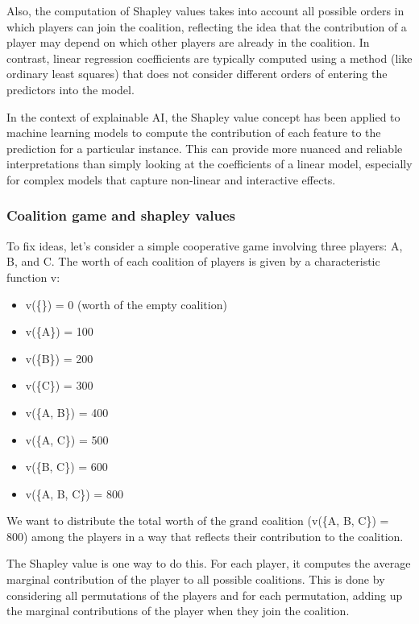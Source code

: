 \documentclass[
  letterpaper,
  DIV=11,
  numbers=noendperiod]{scrartcl}
\providecommand{\tightlist}{%
  \setlength{\itemsep}{0pt}\setlength{\parskip}{0pt}}\usepackage{longtable,booktabs,array}
\begin{document}
Also, the computation of Shapley values takes into account all possible
orders in which players can join the coalition, reflecting the idea that
the contribution of a player may depend on which other players are
already in the coalition. In contrast, linear regression coefficients
are typically computed using a method (like ordinary least squares) that
does not consider different orders of entering the predictors into the
model.

In the context of explainable AI, the Shapley value concept has been
applied to machine learning models to compute the contribution of each
feature to the prediction for a particular instance. This can provide
more nuanced and reliable interpretations than simply looking at the
coefficients of a linear model, especially for complex models that
capture non-linear and interactive effects.

\hypertarget{coalition-game-and-shapley-values}{%
\subsubsection{Coalition game and shapley
values}\label{coalition-game-and-shapley-values}}

To fix ideas, let's consider a simple cooperative game involving three
players: A, B, and C. The worth of each coalition of players is given by
a characteristic function v:

\begin{itemize}
\tightlist
\item
  v(\{\}) = 0 (worth of the empty coalition)
\item
  v(\{A\}) = 100
\item
  v(\{B\}) = 200
\item
  v(\{C\}) = 300
\item
  v(\{A, B\}) = 400
\item
  v(\{A, C\}) = 500
\item
  v(\{B, C\}) = 600
\item
  v(\{A, B, C\}) = 800
\end{itemize}

We want to distribute the total worth of the grand coalition (v(\{A, B,
C\}) = 800) among the players in a way that reflects their contribution
to the coalition.

The Shapley value is one way to do this. For each player, it computes
the average marginal contribution of the player to all possible
coalitions. This is done by considering all permutations of the players
and for each permutation, adding up the marginal contributions of the
player when they join the coalition.
\end{document}
